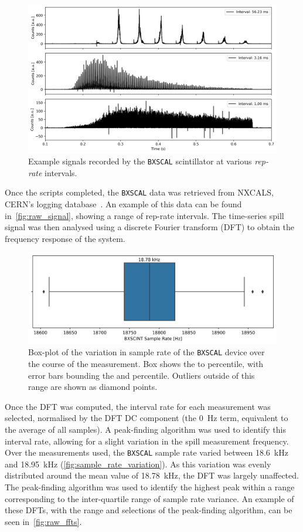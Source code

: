 \documentclass[11pt]{report}
\begin{document}
\begin{figure}
  \centering
  \includegraphics*[width=0.7\linewidth]{raw_signal.png}
  \cprotect\caption{Example signals recorded by the \verb|BXSCAL| scintillator at various \textit{rep-rate} intervals.}\label{fig:raw_signal}
\end{figure}

Once the scripts completed, the \verb|BXSCAL| data was retrieved from NXCALS, CERN's logging database~\cite{nxcals}. An example of this data can be found in~\autoref{fig:raw_signal}, showing a range of rep-rate intervals. The time-series spill signal was then analysed using a discrete Fourier transform (DFT) to obtain the frequency response of the system. 


\begin{figure}
  \centering
  \includegraphics*[width=0.8\linewidth]{sample_rate_variation.png}
  \caption{Box-plot of the variation in sample rate of the \texttt{BXSCAL} device over the course of the measurement. Box shows the  to  percentile, with error bars bounding the  and  percentile. Outliers outside of this range are shown as diamond points.}\label{fig:sample_rate_variation}
\end{figure} %

Once the DFT was computed, the interval rate for each measurement was selected, normalised by the DFT DC component (the \qty{0}{\hertz} term, equivalent to the average of all samples). A peak-finding algorithm was used to identify this interval rate, allowing for a slight variation in the spill measurement frequency. Over the measurements used, the \verb|BXSCAL| sample rate varied between \qty{18.6}{\kilo\hertz} and \qty{18.95}{\kilo\hertz} (\autoref{fig:sample_rate_variation}). As this variation was evenly distributed around the mean value of \qty{18.78}{\kilo\hertz}, the DFT was largely unaffected. The peak-finding algorithm was used to identify the highest peak within a range corresponding to the inter-quartile range of sample rate variance. An example of these DFTs, with the range and selections of the peak-finding algorithm, can be seen in~\autoref{fig:raw_ffts}.
\end{document}
